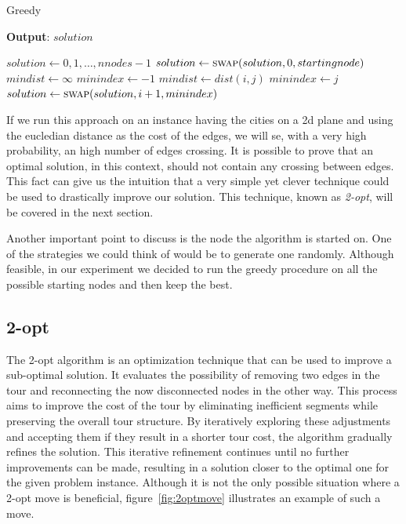 \documentclass{article}
\begin{document}
\begin{algorithm}[ht]
\caption{Greedy}
\label{alg:greedy}
\hspace*{0.5em} \textbf{Output}: $solution$
\begin{algorithmic}
	\State $solution \gets {0, 1, \dots, nnodes - 1}$
	\State $solution \gets \Call{swap}{solution, 0, startingnode}$
                \State $mindist \gets \infty$
                \State $minindex \gets -1$
                                \State $mindist \gets dist(i, j)$
                                \State $minindex \gets j$
                        \EndIf
                \EndFor
                \State $solution \gets \Call{swap}{solution, i + 1, minindex}$
        \EndFor
\EndProcedure
\end{algorithmic}
\end{algorithm}
If we run this approach on an instance having the cities on a 2d plane and using the
eucledian distance as the cost of the edges, we will se, with a very high probability, an
high number of edges crossing.
It is possible to prove that an optimal solution, in this context, should not contain any crossing
between edges.
This fact can give us the intuition that a very simple yet clever technique could be used
to drastically improve our solution. This technique, known as \textit{2-opt}, will be covered
in the next section.

Another important point to discuss is the node the algorithm is started on.
One of the strategies we could think of would be to generate one randomly.
Although feasible, in our experiment we decided to run the greedy procedure
on all the possible starting nodes and then keep the best.


\subsection{2-opt}
The 2-opt algorithm is an optimization technique that can be used to improve a sub-optimal solution.
It evaluates the possibility of removing two edges in the tour and reconnecting the now disconnected nodes in the other way.
This process aims to improve the cost of the tour by eliminating inefficient segments while preserving the overall tour structure. By
iteratively exploring these adjustments and accepting them if they result in a shorter tour cost, the algorithm gradually refines
the solution. This iterative refinement continues until no further improvements can be made, resulting in a
solution closer to the optimal one for the given problem instance.
Although it is not the only possible situation where a 2-opt move is
beneficial, figure~\ref{fig:2optmove} illustrates an example of such a move.
\end{document}
